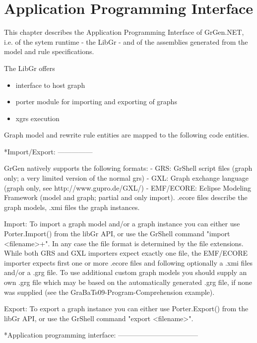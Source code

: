 \chapter{Application Programming Interface}
\label{chapapi}

This chapter describes the Application Programming Interface of GrGen.NET, i.e. of the sytem runtime - the LibGr - and of the assemblies generated from the model and rule specifications.

The LibGr offers
\begin{itemize}
\item interface to host graph
\item porter module for importing and exporting of graphs
\item xgrs execution
\end{itemize}

Graph model and rewrite rule entities are mapped to the following code entities.

*Import/Export:
---------------

GrGen natively supports the following formats:
 - GRS: GrShell script files (graph only; a very limited version of the normal grs)
 - GXL: Graph exchange language (graph only, see http://www.gupro.de/GXL/)
 - EMF/ECORE: Eclipse Modeling Framework (model and graph; partial and only import).
      .ecore files describe the graph models, .xmi files the graph instances.

Import:
To import a graph model and/or a graph instance you can either use
Porter.Import() from the libGr API, or use the GrShell command "import <filename>+".
In any case the file format is determined by the file extensions.
While both GRS and GXL importers expect exactly one file, the EMF/ECORE importer
expects first one or more .ecore files and following optionally a .xmi files and/or
a .grg file. To use additional custom graph models you should supply an own .grg
file which may be based on the automatically generated .grg file, if none was
supplied (see the GraBaTs09-Program-Comprehension example).

Export:
To export a graph instance you can either use Porter.Export() from the libGr API,
or use the GrShell command "export <filename>".


*Application programming interface:
-----------------------------------

